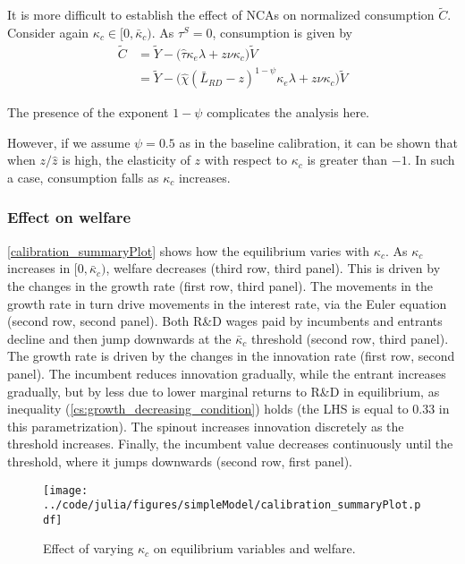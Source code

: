 \documentclass[11pt,english]{article}
\theoremstyle{remark}
\begin{document}
It is more difficult to establish the effect of NCAs on normalized consumption $\tilde{C}$. Consider again $\kappa_c \in [0, \bar{\kappa}_c)$. As $\tau^S = 0$, consumption is given by 
\begin{align}
\tilde{C} &= \tilde{Y} - \Big( \hat{\tau}  \kappa_e \lambda + z \nu \kappa_c \Big) \tilde{V} \\
&= \tilde{Y} - \Big( \hat{\chi} (\bar{L}_{RD} - z)^{1-\psi} \kappa_e \lambda + z \nu \kappa_c \Big) \tilde{V} \label{cs:consumption_eq}
\end{align}

The presence of the exponent $1-\psi$ complicates the analysis here. 

However, if we assume $\psi = 0.5$ as in the baseline calibration, it can be shown that when $z / \hat{z}$ is high, the elasticity of $z$ with respect to $\kappa_c$ is greater than $-1$. In such a case, consumption falls as $\kappa_c$ increases. 

\subsubsection{Effect on welfare}

\autoref{calibration_summaryPlot} shows how the equilibrium varies with $\kappa_c$. As $\kappa_c$ increases in $[0,\bar{\kappa}_c)$, welfare decreases (third row, third panel). This is driven by the changes in the growth rate (first row, third panel). The movements in the growth rate in turn drive movements in the interest rate, via the Euler equation (second row, second panel). Both R\&D wages paid by incumbents and entrants decline and then jump downwards at the $\bar{\kappa}_c$ threshold (second row, third panel). The growth rate is driven by the changes in the innovation rate (first row, second panel). The incumbent reduces innovation gradually, while the entrant increases gradually, but by less due to lower marginal returns to R\&D in equilibrium, as inequality (\ref{cs:growth_decreasing_condition}) holds (the LHS is equal to 0.33 in this parametrization). The spinout increases innovation discretely as the threshold increases. Finally, the incumbent value decreases continuously until the threshold, where it jumps downwards (second row, first panel).

\begin{figure}[]
	\texttt{[image: ../code/julia/figures/simpleModel/calibration\_summaryPlot.pdf]}
	\caption{Effect of varying $\kappa_c$ on equilibrium variables and welfare.}
	\label{calibration_summaryPlot}
\end{figure}
\end{document}
